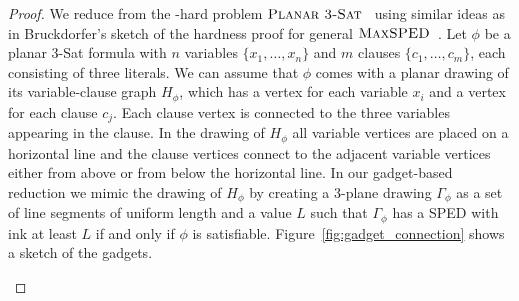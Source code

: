 \documentclass[a4paper,english,numberwithinsect]{eurocg18}
\newcommand{\maxsped}{\ensuremath{\textsc{MaxSPED}}\xspace}
\newcommand{\ppsat}{\ensuremath{\textsc{Planar 3-Sat}}\xspace}
\begin{document}
\begin{proof}
	We reduce from the \NP-hard problem \ppsat~\cite{l-pftu-82} using similar ideas as in Bruckdorfer's sketch of the hardness proof for general \maxsped~\cite{b-sgh-15}. 
	Let $\phi$ be a planar 3-Sat formula with $n$ variables $\{x_1, \dots, x_n\}$ and $m$ clauses $\{c_1, \dots, c_m\}$, each consisting of three literals.
	We can assume that $\phi$ comes with a planar drawing of its variable-clause graph $H_\phi$, which has a vertex for each variable $x_i$ and a vertex for each clause $c_j$.
	Each clause vertex is connected to the three variables appearing in the clause.
	In the drawing of $H_\phi$ all variable vertices are placed on a horizontal line and the clause vertices connect to the adjacent variable vertices either from above or from below the horizontal line.
	In our gadget-based reduction we mimic the drawing of $H_\phi$ by creating a 3-plane drawing $\Gamma_\phi$ as a set of line segments of uniform length and a value $L$ such that $\Gamma_\phi$ has a SPED with ink at least $L$ if and only if $\phi$ is satisfiable.
	Figure~\ref{fig:gadget_connection} shows a sketch of the gadgets.

		\begin{figure}


\end{figure}
\end{proof}
\end{document}
